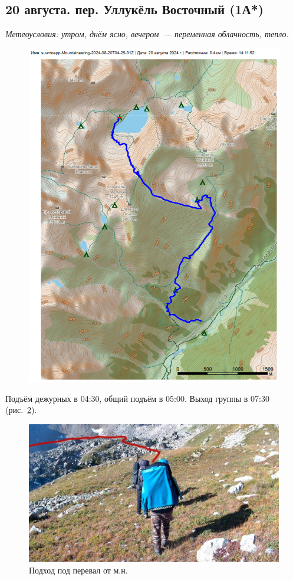 \subsection{20 августа. пер. Уллукёль Восточный (1А*)}
\textit{Метеоусловия: утром, днём ясно, вечером~--- переменная облачность, тепло.}

\begin{figure}[h!]
	\centering
	\includegraphics[angle=0, width=0.7\linewidth]{../pics/mini_maps/20}
	\label{fig:mini_20}
\end{figure}

Подъём дежурных в 04:30, общий подъём в 05:00. Выход группы в 07:30 (рис.~\ref{fig:20aug1.jpg}).

\begin{figure}[h!]
	\centering
	\includegraphics[width=0.7\linewidth]{../pics/20aug1.jpg}
	\caption{Подход под перевал от м.н.}
	\label{fig:20aug1.jpg}
\end{figure}


